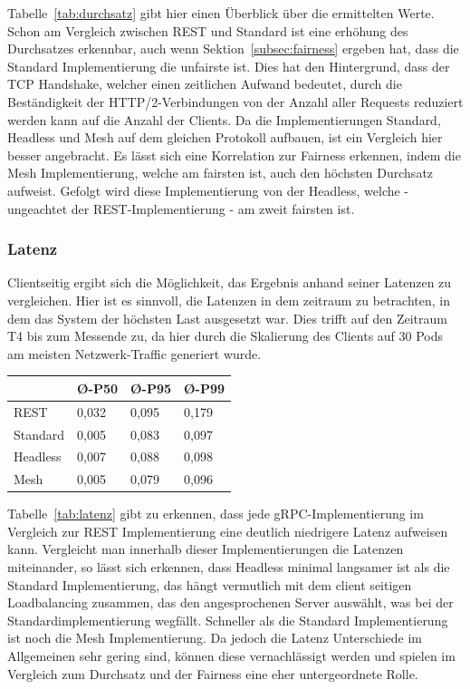 Tabelle~\ref{tab:durchsatz} gibt hier einen Überblick über die ermittelten Werte.
Schon am Vergleich zwischen REST und Standard ist eine erhöhung des Durchsatzes erkennbar, auch wenn Sektion~\ref{subsec:fairness} ergeben hat, dass die Standard Implementierung die unfairste ist.
Dies hat den Hintergrund, dass der TCP Handshake, welcher einen zeitlichen Aufwand bedeutet, durch die Beständigkeit der HTTP/2-Verbindungen von der Anzahl aller Requests reduziert werden kann auf die Anzahl der Clients.
Da die Implementierungen Standard, Headless und Mesh auf dem gleichen Protokoll aufbauen, ist ein Vergleich hier besser angebracht.
Es lässt sich eine Korrelation zur Fairness erkennen, indem die Mesh Implementierung, welche am fairsten ist, auch den höchsten Durchsatz aufweist.
Gefolgt wird diese Implementierung von der Headless, welche - ungeachtet der REST-Implementierung - am zweit fairsten ist.

\subsubsection{Latenz}
Clientseitig ergibt sich die Möglichkeit, das Ergebnis anhand seiner Latenzen zu vergleichen.
Hier ist es sinnvoll, die Latenzen in dem zeitraum zu betrachten, in dem das System der höchsten Last ausgesetzt war.
Dies trifft auf den Zeitraum T4 bis zum Messende zu, da hier durch die Skalierung des Clients auf 30 Pods am meisten Netzwerk-Traffic generiert wurde.

\begin{table}[H]
    \centering
    \begin{tabular}{|l|l|l|l|}
        \hline
        & Ø-P50 & Ø-P95 & Ø-P99 \\ \hline
        REST     & 0,032 & 0,095 & 0,179 \\ \hline
        Standard & 0,005 & 0,083 & 0,097 \\ \hline
        Headless & 0,007 & 0,088 & 0,098 \\ \hline
        Mesh     & 0,005 & 0,079 & 0,096 \\ \hline
    \end{tabular}
\end{table}\label{tab:latenz}

Tabelle~\ref{tab:latenz} gibt zu erkennen, dass jede gRPC-Implementierung im Vergleich zur REST Implementierung eine deutlich niedrigere Latenz aufweisen kann.
Vergleicht man innerhalb dieser Implementierungen die Latenzen miteinander, so lässt sich erkennen, dass Headless minimal langsamer ist als die Standard Implementierung, das hängt vermutlich mit dem client seitigen Loadbalancing zusammen, das den angesprochenen Server auswählt, was bei der Standardimplementierung wegfällt.
Schneller als die Standard Implementierung ist noch die Mesh Implementierung.
Da jedoch die Latenz Unterschiede im Allgemeinen sehr gering sind, können diese vernachlässigt werden und spielen im Vergleich zum Durchsatz und der Fairness eine eher untergeordnete Rolle.

